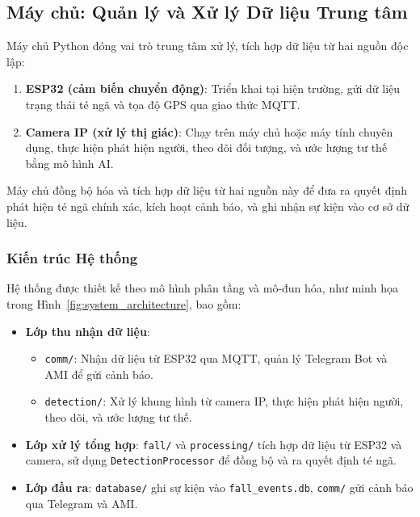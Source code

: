 \subsection{Máy chủ: Quản lý và Xử lý Dữ liệu Trung tâm}
\label{sec:server_overview}

Máy chủ Python đóng vai trò trung tâm xử lý, tích hợp dữ liệu từ hai nguồn độc lập:
\begin{enumerate}
    \item \textbf{ESP32 (cảm biến chuyển động)}: Triển khai tại hiện trường, gửi dữ liệu trạng thái té ngã và tọa độ GPS qua giao thức MQTT.
    \item \textbf{Camera IP (xử lý thị giác)}: Chạy trên máy chủ hoặc máy tính chuyên dụng, thực hiện phát hiện người, theo dõi đối tượng, và ước lượng tư thế bằng mô hình AI.
\end{enumerate}

Máy chủ đồng bộ hóa và tích hợp dữ liệu từ hai nguồn này để đưa ra quyết định phát hiện té ngã chính xác, kích hoạt cảnh báo, và ghi nhận sự kiện vào cơ sở dữ liệu.

\subsubsection{Kiến trúc Hệ thống}
\label{subsubsec:system_overview}

Hệ thống được thiết kế theo mô hình phân tầng và mô-đun hóa, như minh họa trong Hình~\ref{fig:system_architecture}, bao gồm:
\begin{itemize}
    \item \textbf{Lớp thu nhận dữ liệu}:
    \begin{itemize}
        \item \texttt{comm/}: Nhận dữ liệu từ ESP32 qua MQTT, quản lý Telegram Bot và AMI để gửi cảnh báo.
        \item \texttt{detection/}: Xử lý khung hình từ camera IP, thực hiện phát hiện người, theo dõi, và ước lượng tư thế.
    \end{itemize}
    \item \textbf{Lớp xử lý tổng hợp}: \texttt{fall/} và \texttt{processing/} tích hợp dữ liệu từ ESP32 và camera, sử dụng \texttt{DetectionProcessor} để đồng bộ và ra quyết định té ngã.
    \item \textbf{Lớp đầu ra}: \texttt{database/} ghi sự kiện vào \texttt{fall\_events.db}, \texttt{comm/} gửi cảnh báo qua Telegram và AMI.
\end{itemize}

